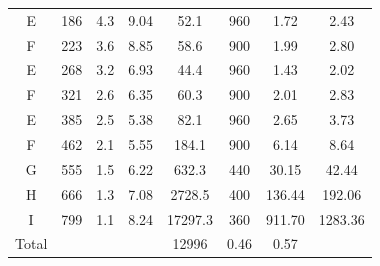 \documentclass[]{spie}  %
\newcommand{\comr}[1]{\textcolor{red}{#1}}
\begin{document}
\begin{table}[ht]
\begin{tabular}{|c|c|c|c|c|c|c|c|}
E   & 186   & 4.3    & 9.04          & 52.1                 & 960         & 1.72                 & 2.43                     \\
F   & 223   & 3.6    & 8.85          & 58.6                 & 900         & 1.99                 & 2.80                     \\
E   & 268   & 3.2    & 6.93          & 44.4                 & 960         & 1.43                 & 2.02                    \\
F   & 321   & 2.6    & 6.35          & 60.3                 & 900         & 2.01                 & 2.83                   \\
E   & 385   & 2.5    & 5.38          & 82.1                 & 960         & 2.65                 & 3.73                    \\
F   & 462   & 2.1    & 5.55          & 184.1                & 900         & 6.14                 & 8.64                     \\
G   & 555   & 1.5    & 6.22          & 632.3                & 440         & 30.15                & 42.44                   \\
H   & 666   & 1.3    & 7.08          & 2728.5               & 400         & 136.44               & 192.06                  \\
I   & 799   & 1.1    & 8.24          & 17297.3              & 360         & 911.70               & 1283.36                 \\ \hline
Total &        &               &                      & 12996       & 0.46              & 0.57               \\ \hline
\end{tabular}
\end{table}




\end{document}
